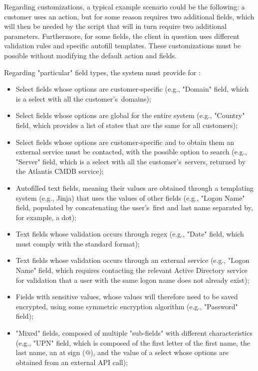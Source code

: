 Regarding customizations, a typical example scenario could be the following: a customer uses an action, but for some reason requires two additional fields, which will then be needed by the script that will in turn require two additional parameters. Furthermore, for some fields, the client in question uses different validation rules and specific autofill templates. These customizations must be possible without modifying the default action and fields.

Regarding "particular" field types, the system must provide for \cite{requirements_meeting}:
\begin{itemize}
  \item Select fields whose options are customer-specific (e.g., "Domain" field, which is a select with all the customer's~domains);
  \item Select fields whose options are global for the entire system (e.g., "Country" field, which provides a list of states that are the same for all customers);
  \item Select fields whose options are customer-specific and to obtain them an external service must be contacted, with the possible option to search (e.g., "Server" field, which is a select with all the customer's~servers, returned by the Atlantis CMDB service);
  \item Autofilled text fields, meaning their values are obtained through a templating system (e.g., Jinja) that uses the values of other fields (e.g., "Logon Name" field, populated by concatenating the user's~first and last name separated by, for example, a dot);
  \item Text fields whose validation occurs through regex (e.g., "Date" field, which must comply with the standard format);
  \item Text fields whose validation occurs through an external service (e.g., "Logon Name" field, which requires contacting the relevant Active Directory service for validation that a user with the same logon name does not already exist);
  \item Fields with sensitive values, whose values will therefore need to be saved encrypted, using some symmetric encryption algorithm (e.g., "Password" field);
  \item "Mixed" fields, composed of multiple "sub-fields" with different characteristics (e.g., "UPN" field, which is composed of the first letter of the first name, the last name, an at sign ($\texttt{@}$), and the value of a select whose options are obtained from an external API call);
\end{itemize}

